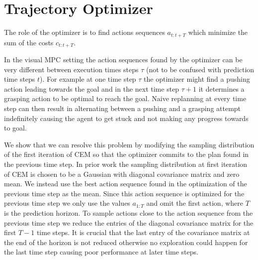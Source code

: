 \section{Trajectory Optimizer}
\label{sec:optimizer}

The role of the optimizer is to find actions sequences $a_{t:t+T}$ which minimize the sum of the costs $c_{t:t+T}$.

In the visual MPC setting the action sequences found by the optimizer can be very different between execution times steps $\tau$ (not to be confused with prediction time steps $t$). For example at one time step $\tau$ the optimizer might find a pushing action leading towards the goal and in the next time step $\tau+1$ it determines a grasping action to be optimal to reach the goal. Naive replanning at every time step can then result in alternating between a pushing and a grasping attempt indefinitely causing the agent to get stuck and not making any progress towards to goal. 

We show that we can resolve this problem by modifying the sampling distribution of the first iteration of CEM so that the optimizer commits to the plan found in the previous time step. In prior work \cite{sna} the sampling distribution at first iteration of CEM is chosen to be a Gaussian with diagonal covariance matrix and zero mean. We instead use the best action sequence found in the optimization of the previous time step as the mean. Since this action sequence is optimized for the previous time step we only use the values $a_{1:T}$ and omit the first action, where $T$ is the prediction horizon. To sample actions close to the action sequence from the previous time step we reduce the entries of the diagonal covariance matrix for the first $T-1$ time steps. It is crucial that the last entry of the covariance matrix at the end of the horizon is not reduced otherwise no exploration could happen for the last time step causing poor performance at later time steps.